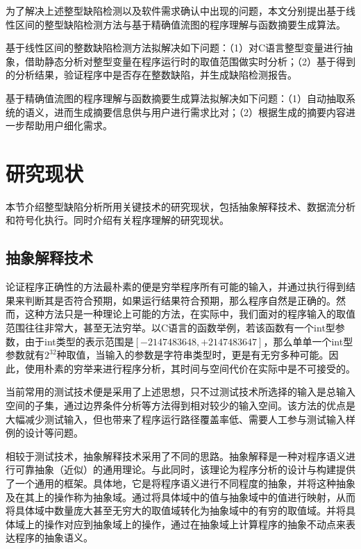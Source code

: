 为了解决上述整型缺陷检测以及软件需求确认中出现的问题，本文分别提出基于线性区间的整型缺陷检测方法与基于精确值流图的程序理解与函数摘要生成算法。

基于线性区间的整数缺陷检测方法拟解决如下问题：（1）对C语言整型变量进行抽象，借助静态分析对整型变量在程序运行时的取值范围做实时分析；（2）基于得到的分析结果，验证程序中是否存在整数缺陷，并生成缺陷检测报告。

基于精确值流图的程序理解与函数摘要生成算法拟解决如下问题：（1）自动抽取系统的语义，进而生成摘要信息供与用户进行需求比对；（2）根据生成的摘要内容进一步帮助用户细化需求。

 \section{研究现状}
 
 本节介绍整型缺陷分析所用关键技术的研究现状，包括抽象解释技术、数据流分析和符号化执行。同时介绍有关程序理解的研究现状。
 
 \subsection{抽象解释技术}
 
 论证程序正确性的方法最朴素的便是穷举程序所有可能的输入，并通过执行得到结果来判断其是否符合预期，如果运行结果符合预期，那么程序自然是正确的。然而，这种方法只是一种理论上可能的方法，在实际中，我们面对的程序输入的取值范围往往非常大，甚至无法穷举。以C语言的函数举例，若该函数有一个int型参数，由于int类型的表示范围是$ \left[  -2147483648, +2147483647 \right] $，那么单单一个int型参数就有$ 2^{32}  $种取值，当输入的参数是字符串类型时，更是有无穷多种可能。因此，使用朴素的穷举来进行程序分析，其时间与空间代价在实际中是不可接受的。
 
 当前常用的测试技术便是采用了上述思想，只不过测试技术所选择的输入是总输入空间的子集，通过边界条件分析等方法得到相对较少的输入空间。该方法的优点是大幅减少测试输入，但也带来了程序运行路径覆盖率低、需要人工参与测试输入样例的设计等问题。
 
 相较于测试技术，抽象解释技术采用了不同的思路。抽象解释是一种对程序语义进行可靠抽象（近似）的通用理论\cite{cousot1977abstract}。与此同时，该理论为程序分析的设计与构建提供了一个通用的框架\cite{cousot1979systematic}。具体地，它是将程序语义进行不同程度的抽象，并将这种抽象及在其上的操作称为抽象域。通过将具体域中的值与抽象域中的值进行映射，从而将具体域中数量庞大甚至无穷大的取值域转化为抽象域中的有穷的取值域。并将具体域上的操作对应到抽象域上的操作，通过在抽象域上计算程序的抽象不动点来表达程序的抽象语义。
 
